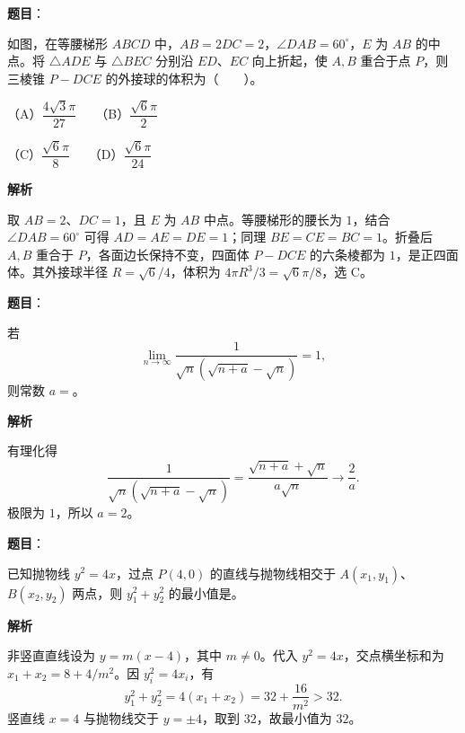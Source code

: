 \begin{answer}

\textbf{题目}：

如图，在等腰梯形 $ABCD$ 中，$AB=2DC=2$，$\angle DAB=60^\circ$，$E$ 为 $AB$ 的中点。将 $\triangle ADE$ 与 $\triangle BEC$ 分别沿 $ED$、$EC$ 向上折起，使 $A,B$ 重合于点 $P$，则三棱锥 $P-DCE$ 的外接球的体积为\mbox{（　　）}。

（A）$\dfrac{4\sqrt3\pi}{27}$　　（B）$\dfrac{\sqrt6\pi}{2}$

（C）$\dfrac{\sqrt6\pi}{8}$　　（D）$\dfrac{\sqrt6\pi}{24}$
\nopagebreak[4]
\begin{center}\end{center}
\nopagebreak[4]
\textbf{解析}

取 $AB=2$、$DC=1$，且 $E$ 为 $AB$ 中点。等腰梯形的腰长为 $1$，结合 $\angle DAB=60^\circ$ 可得 $AD=AE=DE=1$；同理 $BE=CE=BC=1$。折叠后 $A,B$ 重合于 $P$，各面边长保持不变，四面体 $P-DCE$ 的六条棱都为 $1$，是正四面体。其外接球半径 $R=\sqrt6/4$，体积为 $4\pi R^3/3=\sqrt6\pi/8$，选 C。


\end{answer}
\begin{answer}

\textbf{题目}：

若
\nopagebreak[4]
\[
\lim_{n\to\infty}\frac{1}{\sqrt n\left(\sqrt{n+a}-\sqrt n\right)}=1,
\]
则常数 $a=$\gkblank{}。

\textbf{解析}

有理化得
\nopagebreak[4]
\[
\frac{1}{\sqrt n(\sqrt{n+a}-\sqrt n)}
=\frac{\sqrt{n+a}+\sqrt n}{a\sqrt n}
\longrightarrow\frac2a.
\]
极限为 $1$，所以 $a=2$。


\end{answer}
\begin{answer}

\textbf{题目}：

已知抛物线 $y^2=4x$，过点 $P(4,0)$ 的直线与抛物线相交于 $A(x_1,y_1)$、$B(x_2,y_2)$ 两点，则 $y_1^2+y_2^2$ 的最小值是\gkblank{}。

\textbf{解析}

非竖直直线设为 $y=m(x-4)$，其中 $m\ne0$。代入 $y^2=4x$，交点横坐标和为 $x_1+x_2=8+4/m^2$。因 $y_i^2=4x_i$，有
\nopagebreak[4]
\[
y_1^2+y_2^2=4(x_1+x_2)=32+\frac{16}{m^2}>32.
\]
竖直线 $x=4$ 与抛物线交于 $y=\pm4$，取到 $32$，故最小值为 $32$。


\end{answer}
